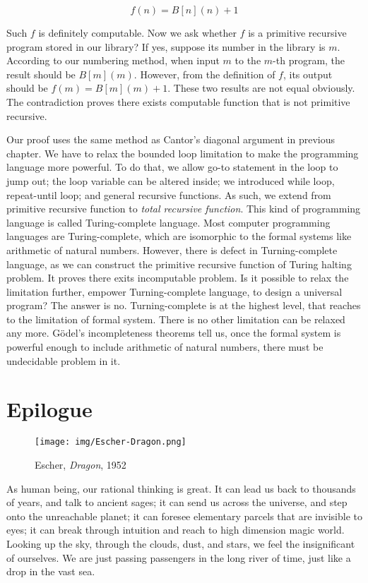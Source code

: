 \documentclass[b5paper]{article}
\begin{document}
\[
f(n) = B[n](n) + 1
\]

Such $f$ is definitely computable. Now we ask whether $f$ is a primitive recursive program stored in our library? If yes, suppose its number in the library is $m$. According to our numbering method, when input $m$ to the $m$-th program, the result should be $B[m](m)$. However, from the definition of $f$, its output should be $f(m) = B[m](m) + 1$. These two results are not equal obviously. The contradiction proves there exists computable function that is not primitive recursive.

Our proof uses the same method as Cantor's diagonal argument in previous chapter. We have to relax the bounded loop limitation to make the programming language more powerful. To do that, we allow go-to statement in the loop to jump out; the loop variable can be altered inside; we introduced while loop, repeat-until loop; and general recursive functions. As such, we extend from primitive recursive function to {\em total recursive function}. This kind of programming language is called Turing-complete language. Most computer programming languages are Turing-complete, which are isomorphic to the formal systems like arithmetic of natural numbers. However, there is defect in Turning-complete language, as we can construct the primitive recursive function of Turing halting problem. It proves there exits incomputable problem. Is it possible to relax the limitation further, empower Turning-complete language, to design a universal program? The answer is no. Turning-complete is at the highest level, that reaches to the limitation of formal system. There is no other limitation can be relaxed any more. Gödel's incompleteness theorems tell us, once the formal system is powerful enough to include arithmetic of natural numbers, there must be undecidable problem in it.

\section{Epilogue}

\begin{figure}[htbp]
 \centering
 \texttt{[image: img/Escher-Dragon.png]}
 \caption{Escher, {\em Dragon}, 1952}
 \label{fig:Escher-Dragon}
\end{figure}

As human being, our rational thinking is great. It can lead us back to thousands of years, and talk to ancient sages; it can send us across the universe, and step onto the unreachable planet; it can foresee elementary parcels that are invisible to eyes; it can break through intuition and reach to high dimension magic world. Looking up the sky, through the clouds, dust, and stars, we feel the insignificant of ourselves. We are just passing passengers in the long river of time, just like a drop in the vast sea.
\end{document}
